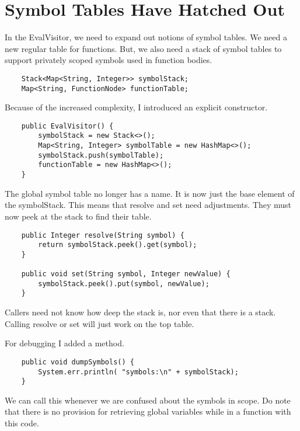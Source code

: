 \section{Symbol Tables Have Hatched Out}

In the EvalVisitor, we need to expand out notions of symbol tables.
We need a new regular table for functions. But, we also need a stack
of symbol tables to support privately scoped symbols used in function
bodies.

{\footnotesize
\begin{verbatim}
    Stack<Map<String, Integer>> symbolStack;
    Map<String, FunctionNode> functionTable;
\end{verbatim}
}

Because of the increased complexity, I introduced an explicit
constructor.

{\footnotesize
\begin{verbatim}
    public EvalVisitor() {
        symbolStack = new Stack<>();
        Map<String, Integer> symbolTable = new HashMap<>();
        symbolStack.push(symbolTable);
        functionTable = new HashMap<>();
    }
\end{verbatim}
}

The global symbol table no longer has a name. It is now just the
base element of the symbolStack. This means that resolve and set
need adjustments. They must now peek at the stack to find their table.

{\footnotesize
\begin{verbatim}
    public Integer resolve(String symbol) {
        return symbolStack.peek().get(symbol);
    }

    public void set(String symbol, Integer newValue) {
        symbolStack.peek().put(symbol, newValue);
    }
\end{verbatim}
}

Callers need not know how deep the stack is, nor even that there is
a stack. Calling resolve or set will just work on the top table.

For debugging I added a method.

{\footnotesize
\begin{verbatim}
    public void dumpSymbols() {
        System.err.println( "symbols:\n" + symbolStack);
    }
\end{verbatim}
}

We can call this whenever we are confused about the symbols in scope.
Do note that there is no provision for retrieving global variables
while in a function with this code.

